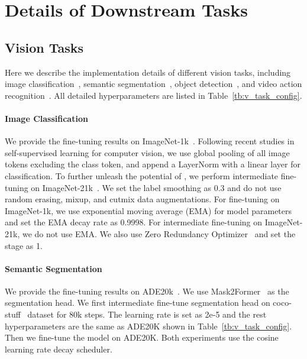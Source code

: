
\section{Details of Downstream Tasks}
\label{app:downstream_tasks}

\subsection{Vision Tasks}
\label{app:vision_details}
Here we describe the implementation details of different vision tasks, including image classification~\cite{inet1k}, semantic segmentation~\cite{Zhou2016SemanticUO}, object detection~\cite{mscoco}, and video action recognition~\cite{k400}.
All detailed hyperparameters are listed in Table~\ref{tb:v_task_config}.

\paragraph{Image Classification}
We provide the fine-tuning results on ImageNet-1k~\cite{inet1k}. Following recent studies in self-supervised learning for computer vision, we use global pooling of all image tokens excluding the class token, and append a LayerNorm with a linear layer for classification. To further unleash the potential of \onepeace, we perform intermediate fine-tuning on ImageNet-21k~\cite{imagenet}. We set the label smoothing as 0.3 and do not use random erasing, mixup, and cutmix data augmentations. For fine-tuning on ImageNet-1k, we use exponential moving average (EMA) for model parameters and set the EMA decay rate as 0.9998. For intermediate fine-tuning on ImageNet-21k, we do not use EMA. We also use Zero Redundancy Optimizer~\cite{zero} and set the stage as 1.

\paragraph{Semantic Segmentation}
We provide the fine-tuning results on ADE20k~\cite{Zhou2016SemanticUO}. We use Mask2Former~\cite{mask2former} as the segmentation head. We first intermediate fine-tune segmentation head on coco-stuff~\cite{cocostuff} dataset for 80k steps. The learning rate is set as 2e-5 and the rest hyperparameters are the same as ADE20K shown in Table~\ref{tb:v_task_config}. Then we fine-tune the model on ADE20K. Both experiments use the cosine learning rate decay scheduler.

